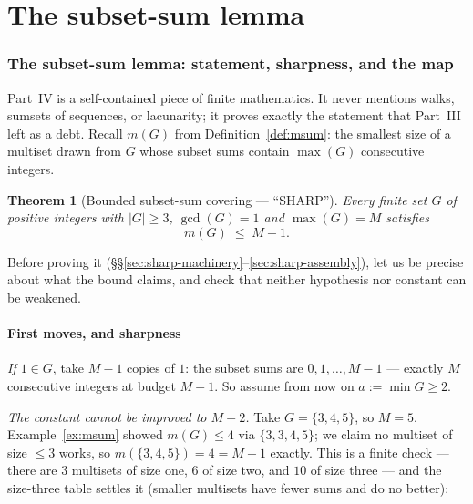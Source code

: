 \documentclass[11pt,reqno]{amsart}
\theoremstyle{plain}
\newtheorem{theorem}{Theorem}[section]
\theoremstyle{definition}
\theoremstyle{remark}
\begin{document}
\part{The subset-sum lemma}

\section{The subset-sum lemma: statement, sharpness, and the map}\label{sec:sharp-intro}

Part~IV is a self-contained piece of finite mathematics. It never mentions walks,
sumsets of sequences, or lacunarity; it proves exactly the statement that Part~III
left as a debt. Recall $m(G)$ from Definition~\ref{def:msum}: the smallest size of
a multiset drawn from $G$ whose subset sums contain $\max(G)$ consecutive integers.

\begin{theorem}[Bounded subset-sum covering --- ``SHARP'']\label{thm:sharp-friendly}
Every finite set $G$ of positive integers with $|G| \ge 3$, $\gcd(G) = 1$ and
$\max(G) = M$ satisfies
\[
  m(G) \;\le\; M - 1 .
\]
\end{theorem}

Before proving it (\S\S\ref{sec:sharp-machinery}--\ref{sec:sharp-assembly}), let us
be precise about what the bound claims, and check that neither hypothesis nor
constant can be weakened.

\subsection{First moves, and sharpness}

\emph{If $1 \in G$}, take $M - 1$ copies of $1$: the subset sums are $0, 1, \dots,
M-1$ --- exactly $M$ consecutive integers at budget $M-1$. So assume from now on
$a := \min G \ge 2$.

\emph{The constant cannot be improved to $M - 2$.} Take $G = \{3,4,5\}$, so $M =
5$. Example~\ref{ex:msum} showed $m(G) \le 4$ via $\{3,3,4,5\}$; we claim no
multiset of size $\le 3$ works, so $m(\{3,4,5\}) = 4 = M - 1$ exactly. This is a
finite check --- there are $3$ multisets of size one, $6$ of size two, and $10$ of
size three --- and the size-three table settles it (smaller multisets have fewer
sums and do no better):
\end{document}
